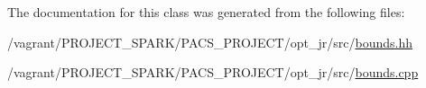 The documentation for this class was generated from the following files\-:\begin{DoxyCompactItemize}
\item 
/vagrant/\-P\-R\-O\-J\-E\-C\-T\-\_\-\-S\-P\-A\-R\-K/\-P\-A\-C\-S\-\_\-\-P\-R\-O\-J\-E\-C\-T/opt\-\_\-jr/src/\hyperlink{bounds_8hh}{bounds.\-hh}\item 
/vagrant/\-P\-R\-O\-J\-E\-C\-T\-\_\-\-S\-P\-A\-R\-K/\-P\-A\-C\-S\-\_\-\-P\-R\-O\-J\-E\-C\-T/opt\-\_\-jr/src/\hyperlink{bounds_8cpp}{bounds.\-cpp}\end{DoxyCompactItemize}
